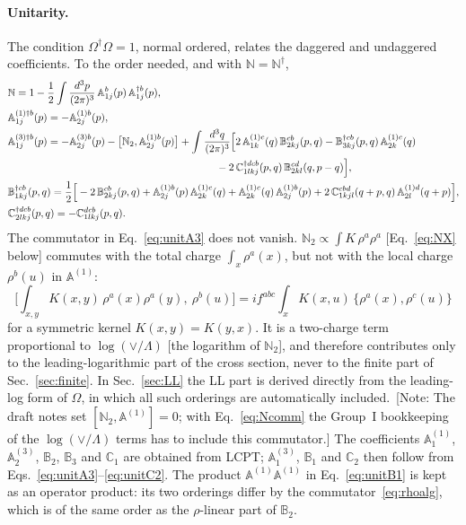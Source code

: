 \documentclass[aps,prd,onecolumn,superscriptaddress,nofootinbib,floatfix,longbibliography,11pt]{revtex4-2}
\numberwithin{equation}{section}
\newif\ifshownotes \shownotestrue
\newcommand{\note}[1]{\ifshownotes{\color{red}\,[\textsf{Note:} #1]}\fi}
\def\mf#1{\mathbb{#1}}
\begin{document}
\paragraph*{Unitarity.} The condition $\Omega^\dagger\Omega=1$, normal ordered, relates the daggered and undaggered coefficients. To the order needed, and with $\mf N=\mf N^\dagger$,
\begin{align}
&\mf N=1-\frac12\int\frac{d^3p}{(2\pi)^3}\,\mf A^{b}_{1j}(p)\,\mf A^{\dagger b}_{1j}(p),\label{eq:unitN}\\
&\mf A^{(1)\dagger b}_{1j}(p)=-\mf A^{(1)b}_{2j}(p),\label{eq:unitA1}\\
&\mf A^{(3)\dagger b}_{1j}(p)=-\mf A^{(3)b}_{2j}(p)-\big[\mf N_2,\mf A^{(1)b}_{2j}(p)\big]+\int\frac{d^3q}{(2\pi)^3}\Big[2\,\mf A^{(1)c}_{1k}(q)\,\mf B^{cb}_{2kj}(p,q)-\mf B^{\dagger cb}_{3kj}(p,q)\,\mf A^{(1)c}_{2k}(q)\notag\\
&\hspace{20em}-2\,\mf C^{\dagger dcb}_{1lkj}(p,q)\,\mf B^{cd}_{2kl}(q,p-q)\Big],\label{eq:unitA3}\\
&\mf B^{\dagger cb}_{1kj}(p,q)=\frac12\Big[-2\,\mf B^{cb}_{2kj}(p,q)+\mf A^{(1)b}_{2j}(p)\,\mf A^{(1)c}_{2k}(q)+\mf A^{(1)c}_{2k}(q)\,\mf A^{(1)b}_{2j}(p)+2\,\mf C^{cbd}_{1kjl}(q+p,q)\,\mf A^{(1)d}_{2l}(q+p)\Big],\label{eq:unitB1}\\
&\mf C^{\dagger dcb}_{2lkj}(p,q)=-\mf C^{dcb}_{1lkj}(p,q).\label{eq:unitC2}
\end{align}
The commutator in Eq.~\eqref{eq:unitA3} does not vanish. $\mf N_2\propto\int K\,\rho^a\rho^a$ [Eq.~\eqref{eq:NX} below] commutes with the total charge $\int_x\rho^a(x)$, but not with the local charge $\rho^b(u)$ in $\mf A^{(1)}$:
\begin{equation}
\Big[\int_{x,y}K(x,y)\,\rho^a(x)\rho^a(y),\ \rho^b(u)\Big]=if^{abc}\int_xK(x,u)\,\big\{\rho^a(x),\rho^c(u)\big\}
\label{eq:Ncomm}
\end{equation}
for a symmetric kernel $K(x,y)=K(y,x)$. It is a two-charge term proportional to $\log(\vee/\Lambda)$ [the logarithm of $\mf N_2$], and therefore contributes only to the leading-logarithmic part of the cross section, never to the finite part of Sec.~\ref{sec:finite}. In Sec.~\ref{sec:LL} the LL part is derived directly from the leading-log form of $\Omega$, in which all such orderings are automatically included.
\note{The draft notes set $[\mf N_2,\mf A^{(1)}]=0$; with Eq.~\eqref{eq:Ncomm} the Group~I bookkeeping of the $\log(\vee/\Lambda)$ terms has to include this commutator.}
The coefficients $\mf A^{(1)}_1$, $\mf A^{(3)}_2$, $\mf B_2$, $\mf B_3$ and $\mf C_1$ are obtained from LCPT; $\mf A^{(3)}_1$, $\mf B_1$ and $\mf C_2$ then follow from Eqs.~\eqref{eq:unitA3}--\eqref{eq:unitC2}. The product $\mf A^{(1)}\mf A^{(1)}$ in Eq.~\eqref{eq:unitB1} is kept as an operator product: its two orderings differ by the commutator~\eqref{eq:rhoalg}, which is of the same order as the $\rho$-linear part of $\mf B_2$.
\end{document}
